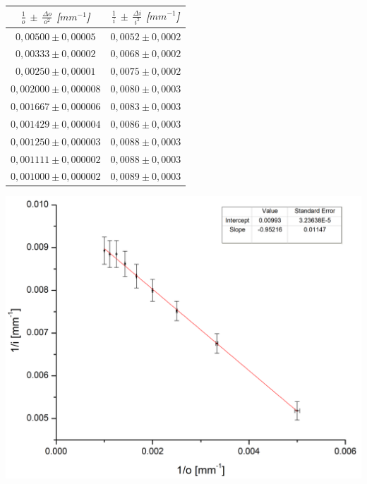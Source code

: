 \documentclass[a4paper,12pt]{article}
\newenvironment{Figure}
  {\par\medskip\noindent\minipage{\linewidth}}
  {\endminipage\par\medskip}
\begin{document}
\begin{multicols*}{2}
\begin{Figure}
            \begin{tabular}{cc}
                \toprule
                \textit{\textbf{$\frac{1}{o}$ $\pm$ $\frac{\Delta o}{o^2}$ [$mm^{-1}$]}} & \textit{\textbf{$\frac{1}{i}$ $\pm$ $\frac{\Delta i}{i^2}$ [$mm^{-1}$]}}\\
                \midrule
                $0,00500 \pm 0,00005$ & $0,0052 \pm 0,0002$ \\ 
                $0,00333 \pm 0,00002$ & $0,0068 \pm 0,0002$ \\ 
                $0,00250 \pm 0,00001$ & $0,0075 \pm 0,0002$ \\ 
                $0,002000 \pm 0,000008$ & $0,0080 \pm 0,0003$ \\ 
                $0,001667 \pm 0,000006$ & $0,0083 \pm 0,0003$ \\ 
                $0,001429 \pm 0,000004$ & $0,0086 \pm 0,0003$ \\ 
                $0,001250 \pm 0,000003$ & $0,0088 \pm 0,0003$ \\ 
                $0,001111 \pm 0,000002$ & $0,0088 \pm 0,0003$ \\ 
                $0,001000 \pm 0,000002$ & $0,0089 \pm 0,0003$ \\
                \bottomrule
            \end{tabular}

            \label{1/i vs 1/o lc}
        \end{Figure}

        \begin{Figure}
            \centering
            \includegraphics[width=1\linewidth]{Grafica LC.png}
            \label{grafica lc}
        \end{Figure}


\end{multicols*}
\end{document}
